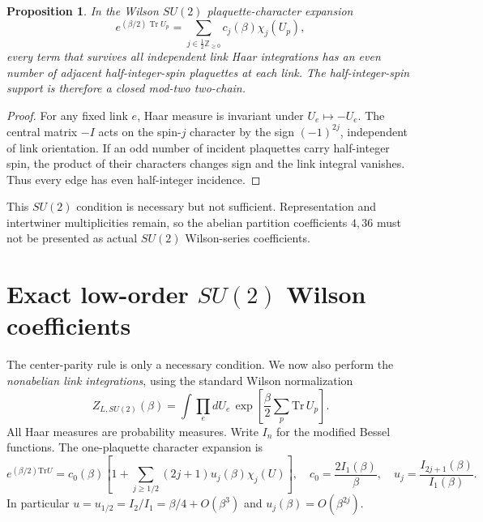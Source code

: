 \documentclass[11pt,a4paper]{article}
\newtheorem{proposition}{Proposition}
\begin{document}
\begin{proposition}\label{prop:center}
In the Wilson \(SU(2)\) plaquette-character expansion
\[
e^{(\beta/2)\operatorname{Tr}U_p}
=\sum_{j\in\frac12\mathbb Z_{\ge0}}c_j(\beta)\chi_j(U_p),
\]
every term that survives all independent link Haar integrations has an even number of adjacent half-integer-spin plaquettes at each link. The half-integer-spin support is therefore a closed mod-two two-chain.
\end{proposition}
\begin{proof}
For any fixed link \(e\), Haar measure is invariant under \(U_e\mapsto-U_e\). The central matrix \(-I\) acts on the spin-\(j\) character by the sign \((-1)^{2j}\), independent of link orientation. If an odd number of incident plaquettes carry half-integer spin, the product of their characters changes sign and the link integral vanishes. Thus every edge has even half-integer incidence.
\end{proof}
This \(SU(2)\) condition is necessary but not sufficient. Representation and intertwiner multiplicities remain, so the abelian partition coefficients \(4,36\) must not be presented as actual \(SU(2)\) Wilson-series coefficients.


\section{Exact low-order $SU(2)$ Wilson coefficients}
The center-parity rule is only a necessary condition. We now also
perform the \emph{nonabelian link integrations}, using the standard
Wilson normalization
\[
Z_{L,SU(2)}(\beta)=\int\prod_e dU_e\,
\exp\!\left[\frac{\beta}{2}\sum_p\mathrm{Tr}\,U_p\right].
\]
All Haar measures are probability measures. Write $I_n$ for the modified
Bessel functions. The one-plaquette character expansion is
\begin{equation}\label{eq:char}
e^{(\beta/2)\mathrm{Tr}U}
=c_0(\beta)\left[1+\sum_{j\ge1/2}
(2j+1)u_j(\beta)\chi_j(U)\right],\quad
c_0=\frac{2I_1(\beta)}{\beta},\quad
u_j=\frac{I_{2j+1}(\beta)}{I_1(\beta)} .
\end{equation}
In particular $u=u_{1/2}=I_2/I_1=\beta/4+O(\beta^3)$
and $u_j(\beta)=O(\beta^{2j})$.
\end{document}
